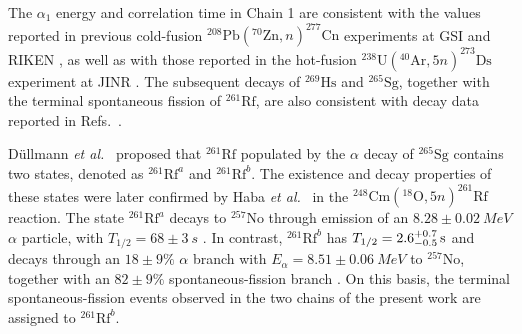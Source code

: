 \documentclass[aps,prc,reprint,superscriptaddress,floatfix]{revtex4-2}
\newcommand{\myerr}[4]{\SI[parse-numbers=false]{#1^{+#2}_{-#3}}{#4}}
\begin{document}
The $\alpha_{1}$ energy and correlation time in Chain 1 are consistent with the values reported in previous cold-fusion $^{208}\mathrm{Pb}(^{70}\mathrm{Zn}, n)^{277}\mathrm{Cn}$ experiments at GSI \cite{hofmann2002NewResultsElements,hofmann1996NewElement112} and RIKEN \cite{sumita2013NewResultProduction,morita2007ExperimentSynthesisIsotope277}, as well as with those reported in the hot-fusion $^{238}\mathrm{U}(^{40}\mathrm{Ar}, 5n)^{273}\mathrm{Ds}$ experiment at JINR \cite{oganessian2024SynthesisDecayProperties}. The subsequent decays of $^{269}\mathrm{Hs}$ and $^{265}\mathrm{Sg}$, together with the terminal spontaneous fission of $^{261}\mathrm{Rf}$, are also consistent with decay data reported in Refs.~\cite{dvorakDoublyMagicNucleus2006,dullmannCm248Ne2008,dvorakObservation3Evaporation2008,graegerExperimentalStudy2382010,vonzweidorfEvidenceFormationSodium2004,habaProductionDecayProperties2011,habaProduction265Sg2012}.

D\"ullmann \textit{et al.}~\cite{dullmannCm248Ne2008} proposed that $^{261}\mathrm{Rf}$ populated by the $\alpha$ decay of $^{265}\mathrm{Sg}$ contains two states, denoted as $^{261}\mathrm{Rf}^{a}$ and $^{261}\mathrm{Rf}^{b}$. The existence and decay properties of these states were later confirmed by Haba \textit{et al.}~\cite{habaProductionDecayProperties2011} in the $^{248}\mathrm{Cm}(^{18}\mathrm{O}, 5n)^{261}\mathrm{Rf}$ reaction. The state $^{261}\mathrm{Rf}^{a}$ decays to $^{257}\mathrm{No}$ through emission of an $8.28\pm0.02~\si{MeV}$ \cite{firestone_2025_ahwst-0j467} $\alpha$ particle, with $T_{1/2} = 68\pm 3~\si{s}$ \cite{habaProduction265Sg2012}. In contrast, $^{261}\mathrm{Rf}^{b}$ has $T_{1/2} = \myerr{2.6}{0.7}{0.5}{s}$ and decays through an $18\pm9\%$ $\alpha$ branch with $E_{\alpha} = 8.51\pm0.06~\si{MeV}$ to $^{257}\mathrm{No}$, together with an $82\pm9\%$ spontaneous-fission branch \cite{habaProductionDecayProperties2011}. On this basis, the terminal spontaneous-fission events observed in the two chains of the present work are assigned to $^{261}\mathrm{Rf}^{b}$.
\end{document}

